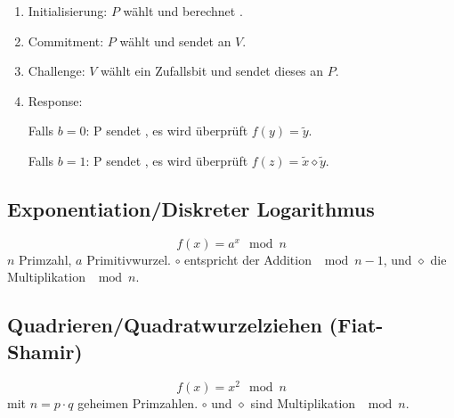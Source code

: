 \begin{enumerate}
    \item Initialisierung:
        $P$ wählt  und berechnet .
    \item Commitment:
        $P$ wählt  und sendet  an $V$.
    \item Challenge:
        $V$ wählt ein Zufallsbit  und sendet dieses an $P$.
    \item Response:
        
        Falls $b=0$: P sendet , es wird überprüft $f(y) = \tilde{y}$.

        Falls $b=1$: P sendet , es wird überprüft 
        $f(z) = \tilde{x} \diamond \tilde{y}$.
\end{enumerate}

\subsection{Exponentiation/Diskreter Logarithmus}
\begin{equation}
    f(x) = a^x \mod n
\end{equation}
$n$ Primzahl, $a$ Primitivwurzel. $\circ$ entspricht der Addition $\mod n-1$, und
$\diamond$ die Multiplikation $\mod n$.

\subsection{Quadrieren/Quadratwurzelziehen (Fiat-Shamir)}
\begin{equation}
    f(x) = x^2 \mod n
\end{equation}
mit $n=p \cdot q$ geheimen Primzahlen. $\circ$ und $\diamond$ sind Multiplikation $\mod n$.
